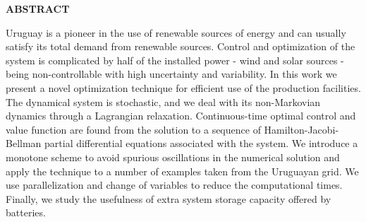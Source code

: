 \begin{center}

\end{center}

\begin{center}
{{\bf\fontsize{14pt}{14.5pt}\selectfont \uppercase{ABSTRACT}}}
\end{center}


\begin{center}
{{\fontsize{14pt}{14.5pt}\selectfont {Stochastic Optimal Control of Renewable Energy\\
Renzo Miguel Caballero Rosas}}}
\end{center}

Uruguay is a pioneer in the use of renewable sources of energy and can usually satisfy its total demand from renewable sources. Control and optimization of the system is complicated by half of the installed power - wind and solar sources - being non-controllable with high uncertainty and variability. In this work we present a novel optimization technique for efficient use of the production facilities. The dynamical system is stochastic, and we deal with its non-Markovian dynamics through a Lagrangian relaxation. Continuous-time optimal control and value function are found from the solution to a sequence of Hamilton-Jacobi-Bellman partial differential equations associated with the system. We introduce a monotone scheme to avoid spurious oscillations in the numerical solution and apply the technique to a number of examples taken from the Uruguayan grid. We use parallelization and change of variables to reduce the computational times. Finally, we study the usefulness of extra system storage capacity offered by batteries.

